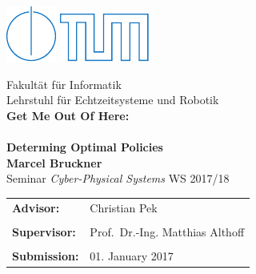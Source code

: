 \begin{figure}[!h]

  \includegraphics{./images/IN.pdf} \hfill \includegraphics{./images/tumlogo.pdf}
 
  \vspace*{1cm}
  {\large \textsf{Fakult{\"a}t f{\"u}r Informatik}}\\
  {\large \textsf{Lehrstuhl f{\"u}r Echtzeitsysteme und Robotik}}\\
   

  \vspace*{5cm}
%
%
%
%
  {\color{tumblue} \Huge \bf \textsf{Get Me Out Of Here: \\\\Determing Optimal Policies}}\\  %

  \vspace*{1cm}
%
%
%
% 
  {\Large \bf \textsf{Marcel Bruckner}}\\   %
 
  \vspace*{8cm}
  {\Large \textsf{Seminar \emph{Cyber-Physical Systems} WS 2017/18}}\\
 
  \vspace*{1cm} 
  \begin{tabular}{ll}
%
%
%
%
    {\Large \bf \textsf{Advisor:}} &
    {\Large \textsf{Christian Pek}}\\                  %
    \\

    {\Large \bf \textsf{Supervisor:}} &
    {\Large \textsf{Prof.~Dr.-Ing. Matthias Althoff}}\\
    \\

%
%
%
%
    {\Large \bf \textsf{Submission:}} &
    {\Large \textsf{01. January 2017}}

  \end{tabular}
  
\end{figure}
